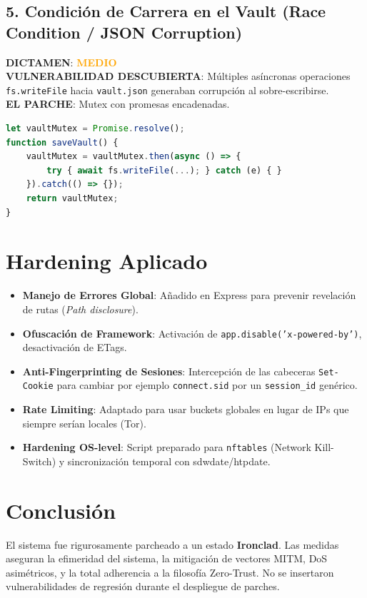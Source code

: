 \documentclass[12pt,a4paper]{article}
\begin{document}
\subsection{5. Condición de Carrera en el Vault (Race Condition / JSON Corruption)}
\textbf{DICTAMEN}: \textcolor{orange}{\textbf{MEDIO}}\\
\textbf{VULNERABILIDAD DESCUBIERTA}: Múltiples asíncronas operaciones \texttt{fs.writeFile} hacia \texttt{vault.json} generaban corrupción al sobre-escribirse.\\
\textbf{EL PARCHE}: Mutex con promesas encadenadas.
\begin{lstlisting}[language=JavaScript]
let vaultMutex = Promise.resolve();
function saveVault() {
    vaultMutex = vaultMutex.then(async () => {
        try { await fs.writeFile(...); } catch (e) { }
    }).catch(() => {});
    return vaultMutex;
}
\end{lstlisting}

\section{Hardening Aplicado}
\begin{itemize}
    \item \textbf{Manejo de Errores Global}: Añadido en Express para prevenir revelación de rutas (\textit{Path disclosure}).
    \item \textbf{Ofuscación de Framework}: Activación de \texttt{app.disable('x-powered-by')}, desactivación de ETags.
    \item \textbf{Anti-Fingerprinting de Sesiones}: Intercepción de las cabeceras \texttt{Set-Cookie} para cambiar por ejemplo \texttt{connect.sid} por un \texttt{session\_id} genérico.
    \item \textbf{Rate Limiting}: Adaptado para usar buckets globales en lugar de IPs que siempre serían locales (Tor).
    \item \textbf{Hardening OS-level}: Script preparado para \texttt{nftables} (Network Kill-Switch) y sincronización temporal con sdwdate/htpdate.
\end{itemize}

\section{Conclusión}
El sistema fue rigurosamente parcheado a un estado \textbf{Ironclad}. Las medidas aseguran la efimeridad del sistema, la mitigación de vectores MITM, DoS asimétricos, y la total adherencia a la filosofía Zero-Trust. No se insertaron vulnerabilidades de regresión durante el despliegue de parches.
\end{document}
